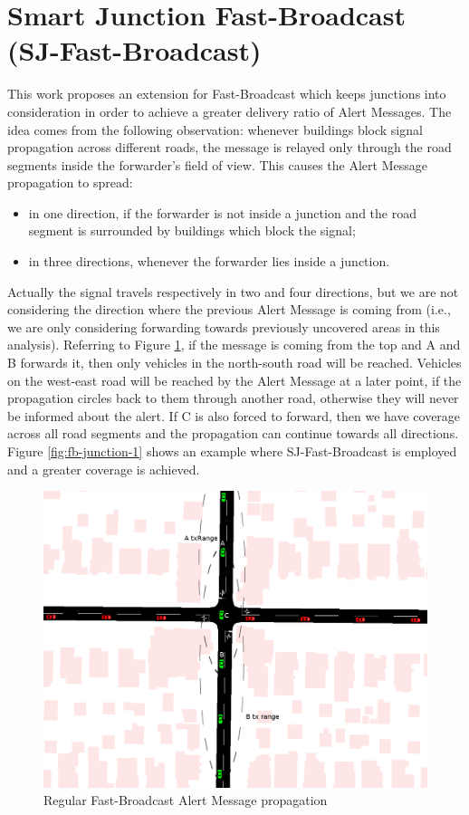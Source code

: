 	\section{Smart Junction Fast-Broadcast (SJ-Fast-Broadcast)}
		\label{sj:fb}
		This work proposes an extension for Fast-Broadcast which keeps junctions into consideration in order to achieve a greater delivery ratio of Alert Messages. The idea comes from the following observation: whenever buildings block signal propagation across different roads, the message is relayed only through the road segments inside the forwarder's field of view. This causes the Alert Message propagation to spread:
		\begin{itemize}
			\item in one direction, if the forwarder is not inside a junction and the road segment is surrounded by buildings which block the signal;
			\item in three directions, whenever the forwarder lies inside a junction. 
		\end{itemize}
		Actually the signal travels respectively in two and four directions, but we are not considering the direction where the previous Alert Message is coming from (i.e., we are only considering forwarding towards previously uncovered areas in this analysis).
		Referring to Figure \ref{fig:fb-junction-0}, if the message is coming from the top and A and B forwards it, then only vehicles in the north-south road will be reached. Vehicles on the west-east road will be reached by the Alert Message at a later point, if the propagation circles back to them through another road, otherwise they will never be informed about the alert. If C is also forced to forward, then we have coverage across all road segments and the propagation can continue towards all directions. Figure \ref{fig:fb-junction-1} shows an example where SJ-Fast-Broadcast is employed and a greater coverage is achieved.
		
		\begin{figure}[H]
			\centering
			\includegraphics[width=\textwidth]{immagini/fb-junction-0}
			\caption{Regular Fast-Broadcast Alert Message propagation}
			\label{fig:fb-junction-0}
		\end{figure}
	
